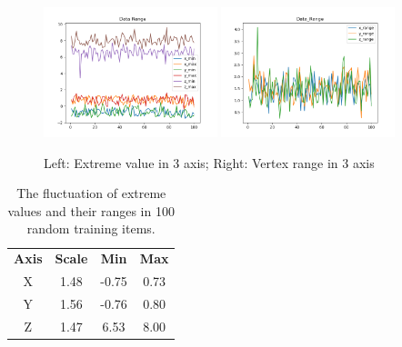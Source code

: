 \documentclass[border=15pt, multi, tikz]{article}
\newcommand{\tabhead}[1]{\textbf{#1}}
\begin{document}
\begin{figure}[!h]
	\centering
	{\includegraphics[width=0.45\textwidth]{./Figures/Data_Extreme.png}}
	{\includegraphics[width=0.45\textwidth]{./Figures/Data_Range.png}}
	\label{fig:data_range}
	\caption{Left: Extreme value in 3 axis; Right: Vertex range in 3 axis}
\end{figure}

\begin{table}[h!]
	\caption{ The fluctuation of extreme values and their ranges in 100 random training items. 
	}
	\label{tab:data-range}
	\centering
	\begin{tabular}{c c c c}
		\tabhead{Axis} & \tabhead{Scale} & \tabhead{Min} & \tabhead{Max}\\
		X & 1.48 & -0.75 & 0.73\\
		Y & 1.56 & -0.76 & 0.80\\
		Z & 1.47 & 6.53 & 8.00\\

	\end{tabular}
\end{table}
\end{document}
